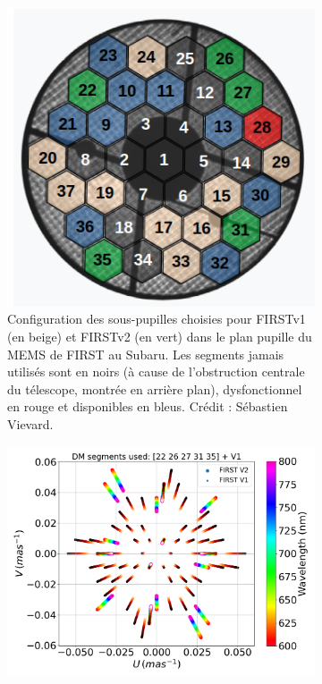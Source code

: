 \begin{figure}[ht!]
    \centering
    \begin{subfigure}[t]{0.43\textwidth}
        \centering
        \includegraphics[width=\textwidth]{Figure_Chap5/BaselineMap_Subaru_V1_V2_20221010.png}
        \caption{Configuration des sous-pupilles choisies pour FIRSTv1 (en beige) et FIRSTv2 (en vert) dans le plan pupille du MEMS de FIRST au Subaru. Les segments jamais utilisés sont en noirs (à cause de l'obstruction centrale du télescope, montrée en arrière plan), dysfonctionnel en rouge et disponibles en bleus. Crédit : Sébastien Vievard.}
        \label{fig:SegUVSubaruA}
    \end{subfigure}\hfill
    \begin{subfigure}[t]{0.55\textwidth}
        \centering
        \includegraphics[width=\textwidth]{Figure_Chap5/UVplane_Subaru_22_26_27_31_35_V1.png}

\end{subfigure}
\end{figure}
